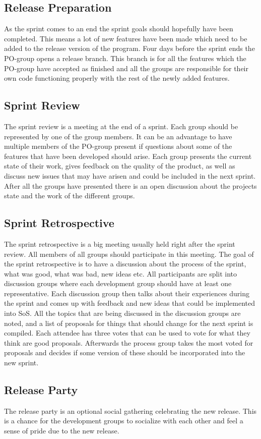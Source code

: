 \subsection{Release Preparation}
As the sprint comes to an end the sprint goals should hopefully have been completed.
This means a lot of new features have been made which need to be added to the release version of the program.
Four days before the sprint ends the PO-group opens a release branch.
This branch is for all the features which the PO-group have accepted as finished and all the groups are responsible for their own code functioning properly with the rest of the newly added features.


\subsection{Sprint Review} \label{subsec:SoS-sprint-review}
The sprint review is a meeting at the end of a sprint. 
Each group should be represented by one of the group members. 
It can be an advantage to have multiple members of the PO-group present if questions about some of the features that have been developed should arise.
Each group presents the current state of their work, gives feedback on the quality of the product, as well as discuss new issues that may have arisen and could be included in the next sprint.
After all the groups have presented there is an open discussion about the projects state and the work of the different groups.

\subsection{Sprint Retrospective}
The sprint retrospective is a big meeting usually held right after the sprint review.
All members of all groups should participate in this meeting.
The goal of the sprint retrospective is to have a discussion about the process of the sprint, what was good, what was bad, new ideas etc.
All participants are split into discussion groups where each development group should have at least one representative.
\newline
\newline
Each discussion group then talks about their experiences during the sprint and comes up with feedback and new ideas that could be implemented into SoS.
All the topics that are being discussed in the discussion groups are noted, and a list of proposals for things that should change for the next sprint is compiled.
Each attendee has three votes that can be used to vote for what they think are good proposals.
Afterwards the process group takes the most voted for proposals and decides if some version of these should be incorporated into the new sprint.

\subsection{Release Party}
The release party is an optional social gathering celebrating the new release. 
This is a chance for the development groups to socialize with each other and feel a sense of pride due to the new release.

